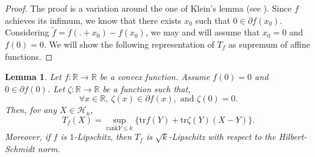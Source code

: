 \documentclass[aop,preprint]{imsart}
\newcommand\RR{\mathbb{R}}
\newcommand\tr{\mathrm{tr}}
\newcommand\rk{\mathrm{rank}}
\numberwithin{equation}{section}
\theoremstyle{definition}
\theoremstyle{plain}
\newtheorem{Lem}[Def]{Lemma}
\theoremstyle{remark}
\begin{document}
\begin{proof}\renewcommand{\qedsymbol}{} The proof is a variation around the one of Klein's lemma (see  \cite[Lemma 4.4.12]{AGZ}). Since $f$ achieves its infimum, we know that there exists $x_0$ such that $0 \in \partial f(x_0)$. Considering $\tilde{f} = f(.+x_0)-f(x_0)$, we may and will assume that $x_0 = 0$ and $f(0)=0$.
We will show the following representation of $T_f$ as supremum of affine functions.
\end{proof}
\begin{Lem}\label{fnsup} Let $f:\RR \to \RR$ be a convex function.
Assume $f(0)=0$ and $0\in \partial f (0)$. Let $\zeta : \RR \to \RR$ be a function such that, 
$$ \forall x \in \RR, \ \zeta(x) \in \partial f(x), \text{ and } \zeta(0)=0.$$
Then, for any $X \in \mathcal{H}_n$,
\begin{equation} \label{respresaff} T_f(X) = \sup_{ \rk Y \leq k} \{ \tr f(Y) + \tr \zeta(Y)(X-Y) \}.\end{equation}
Moreover, if $f$ is $1$-Lipschitz, then $T_f$ is $\sqrt{k}$-Lipschitz with respect to the Hilbert-Schmidt norm.
\end{Lem}
\end{document}
